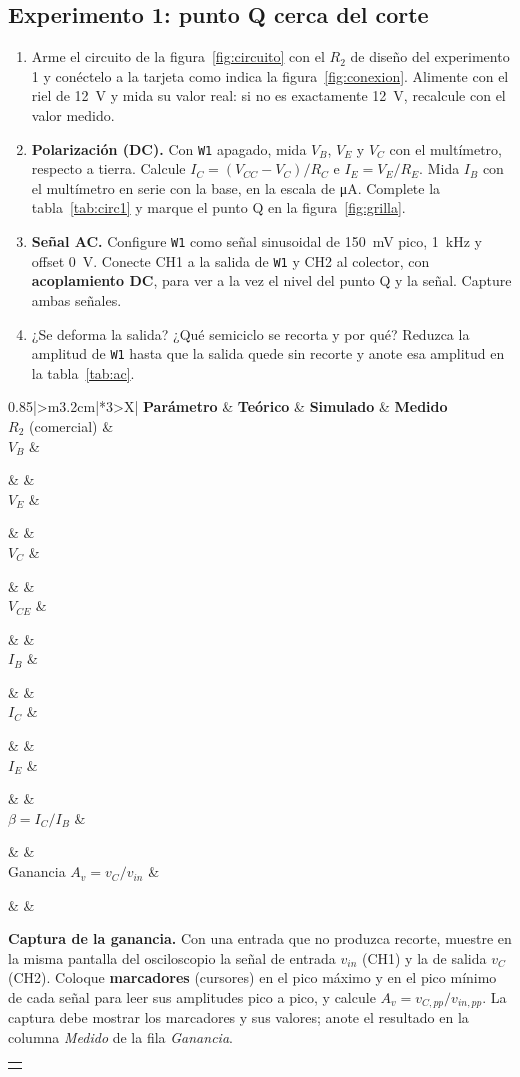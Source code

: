 \documentclass[11pt,a4paper]{article}
\newcommand{\cuadrorespuesta}{%
  \par\vspace{6pt}\noindent
  \begin{tabularx}{\linewidth}{|>{\centering\arraybackslash}X|}
    \hline
    \rule{0pt}{4.4cm}\raisebox{2.1cm}{\textcolor{black!45}{Figura}}\\
    \hline
    \rule{0pt}{2.0cm}\raisebox{0.9cm}{\textcolor{black!45}{Comentario}}\\
    \hline
  \end{tabularx}\par\vspace{8pt}%
}
\newcommand{\capturaganancia}{%
  \par\needspace{8.2cm}\vspace{4pt}\noindent
  \textbf{Captura de la ganancia.} Con una entrada que no produzca recorte, muestre en la
  misma pantalla del osciloscopio la señal de entrada $v_{in}$ (CH1) y la de salida $v_C$
  (CH2). Coloque \textbf{marcadores} (cursores) en el pico máximo y en el pico mínimo de
  cada señal para leer sus amplitudes pico a pico, y calcule
  $A_v = v_{C,pp}/v_{in,pp}$. La captura debe mostrar los marcadores y sus valores; anote el
  resultado en la columna \emph{Medido} de la fila \emph{Ganancia}.%
  \cuadrorespuesta
}
\newcommand{\hueco}{\rule{0pt}{0.5cm}}
\newcommand{\tablamedicion}[2]{%
  \begin{table}[H]
    \centering
    \renewcommand{\arraystretch}{1.15}
    \begin{tabularx}{0.85\linewidth}{|>{\centering\arraybackslash}m{3.2cm}|*{3}{>{\centering\arraybackslash}X|}}
      \hline
      \textbf{Parámetro} & \textbf{Teórico} & \textbf{Simulado} & \textbf{Medido}\\
      \hline
      $R_2$ (comercial) & \multicolumn{3}{c|}{\hueco} \\ \hline
      $V_B$      & \hueco & & \\ \hline
      $V_E$      & \hueco & & \\ \hline
      $V_C$      & \hueco & & \\ \hline
      $V_{CE}$   & \hueco & & \\ \hline
      $I_B$      & \hueco & & \\ \hline
      $I_C$      & \hueco & & \\ \hline
      $I_E$      & \hueco & & \\ \hline
      $\beta = I_C/I_B$ & \hueco & & \\ \hline
      Ganancia $A_v = v_C/v_{in}$ & \hueco & & \\ \hline
    \end{tabularx}
    \caption{#1}
    \label{#2}
  \end{table}%
}
\begin{document}
\subsection{Experimento 1: punto Q cerca del corte}
\begin{enumerate}[label=\roman*., leftmargin=*, labelsep=0.6em]
  \item Arme el circuito de la figura~\ref{fig:circuito} con el $R_2$ de diseño del experimento
        1 y conéctelo a la tarjeta como indica la figura~\ref{fig:conexion}. Alimente con
        el riel de \qty{+12}{\volt} y mida su valor real: si no es exactamente
        \qty{12}{\volt}, recalcule con el valor medido.
  \item \textbf{Polarización (DC).} Con \texttt{W1} apagado, mida $V_B$, $V_E$ y $V_C$ con el
        multímetro, respecto a tierra. Calcule $I_C = (V_{CC} - V_C)/R_C$ e
        $I_E = V_E/R_E$. Mida $I_B$ con el multímetro en serie con la base, en la escala de
        \unit{\micro\ampere}. Complete la tabla~\ref{tab:circ1} y marque el punto Q en la
        figura~\ref{fig:grilla}.
  \item \textbf{Señal AC.} Configure \texttt{W1} como señal sinusoidal de
        \qty{150}{\milli\volt} pico, \qty{1}{\kilo\hertz} y offset \qty{0}{\volt}. Conecte
        CH1 a la salida de \texttt{W1} y CH2 al colector, con \textbf{acoplamiento DC}, para
        ver a la vez el nivel del punto Q y la señal. Capture ambas señales.
  \item ¿Se deforma la salida? ¿Qué semiciclo se recorta y por qué? Reduzca la amplitud de
        \texttt{W1} hasta que la salida quede sin recorte y anote esa amplitud en la
        tabla~\ref{tab:ac}.
\end{enumerate}

\tablamedicion{Experimento 1: punto Q cerca del corte.}{tab:circ1}

\capturaganancia

\clearpage
\end{document}
